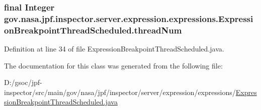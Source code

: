 \subsubsection[{\texorpdfstring{thread\+Num}{threadNum}}]{\setlength{\rightskip}{0pt plus 5cm}final Integer gov.\+nasa.\+jpf.\+inspector.\+server.\+expression.\+expressions.\+Expression\+Breakpoint\+Thread\+Scheduled.\+thread\+Num\hspace{0.3cm}{\ttfamily [private]}}\hypertarget{classgov_1_1nasa_1_1jpf_1_1inspector_1_1server_1_1expression_1_1expressions_1_1_expression_breakpoint_thread_scheduled_ada71b9ee313dfce2cd7b53c32cb0d3a8}{}\label{classgov_1_1nasa_1_1jpf_1_1inspector_1_1server_1_1expression_1_1expressions_1_1_expression_breakpoint_thread_scheduled_ada71b9ee313dfce2cd7b53c32cb0d3a8}


Definition at line 34 of file Expression\+Breakpoint\+Thread\+Scheduled.\+java.



The documentation for this class was generated from the following file\+:\begin{DoxyCompactItemize}
\item 
D\+:/gsoc/jpf-\/inspector/src/main/gov/nasa/jpf/inspector/server/expression/expressions/\hyperlink{_expression_breakpoint_thread_scheduled_8java}{Expression\+Breakpoint\+Thread\+Scheduled.\+java}\end{DoxyCompactItemize}
